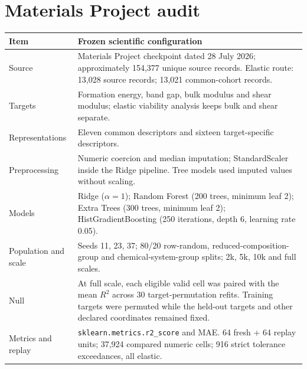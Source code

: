 \documentclass[11pt,a4paper,oneside]{report}
\begin{document}
\section*{Materials Project audit}
\begin{longtable}{p{}p{}}
\toprule Item & Frozen scientific configuration\\\midrule
Source & Materials Project checkpoint dated 28 July 2026; approximately 154,377 unique source records. Elastic route: 13,028 source records; 13,021 common-cohort records.\\
Targets & Formation energy, band gap, bulk modulus and shear modulus; elastic viability analysis keeps bulk and shear separate.\\
Representations & Eleven common descriptors and sixteen target-specific descriptors.\\
Preprocessing & Numeric coercion and median imputation; StandardScaler inside the Ridge pipeline. Tree models used imputed values without scaling.\\
Models & Ridge ($\alpha=1$); Random Forest (200 trees, minimum leaf 2); Extra Trees (300 trees, minimum leaf 2); HistGradientBoosting (250 iterations, depth 6, learning rate 0.05).\\
Population and scale & Seeds 11, 23, 37; 80/20 row-random, reduced-composition-group and chemical-system-group splits; 2k, 5k, 10k and full scales.\\
Null & At full scale, each eligible valid cell was paired with the mean $R^2$ across 30 target-permutation refits. Training targets were permuted while the held-out targets and other declared coordinates remained fixed.\\
Metrics and replay & \texttt{sklearn.metrics.r2\_score} and MAE. 64 fresh + 64 replay units; 37,924 compared numeric cells; 916 strict tolerance exceedances, all elastic.\\
\bottomrule
\end{longtable}
\end{document}

